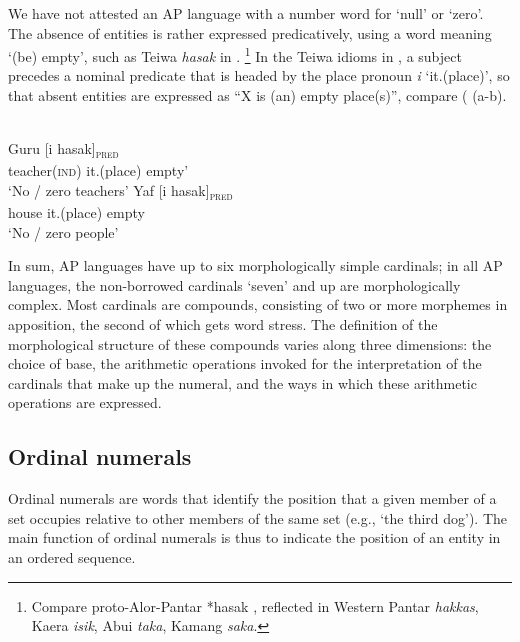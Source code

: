 We have not attested an AP language with a number word for `null' or `zero'. The absence of entities is rather expressed predicatively, using a word meaning `(be) empty', such as Teiwa \textit{hasak} in .
\footnote{{}  Compare proto-Alor-Pantar *hasak \citep{HoltonRobinsonTV}, reflected in Western Pantar \textit{hakkas}, Kaera \textit{isik}, Abui \textit{taka}, Kamang \textit{saka}.} In the Teiwa idioms in , a subject precedes a nominal predicate that is headed by the place pronoun \textit{i} `it.(place)', so that absent entities are expressed as ``X is (an) empty place(s)'', compare ( (a-b).


\ea%
\label{bkm:Ref355363568}
\\
\ea
\label{ex:8:1234}
\gll Guru       [i       hasak]\textsc{\textsubscript{pred}} \\  
     teacher\textsc{(ind)}   it.(place)    empty'  \\
\glt  `No / zero teachers' 
\ex
\gll Yaf [i     hasak]\textsc{\textsubscript{pred}} \\
    house      it.(place)   empty\\
\glt    `No / zero people' 
\z
\z

In sum, AP languages have up to six morphologically simple cardinals; in all AP languages, the non-borrowed cardinals `seven' and up are morphologically complex. Most cardinals are compounds, consisting of two or more morphemes in apposition, the second of which gets word stress. The definition of the morphological structure of these compounds varies along three dimensions: the choice of base, the arithmetic operations invoked for the interpretation of the cardinals that make up the numeral, and the ways in which these arithmetic operations are expressed. 

\subsection{Ordinal  numerals}
\label{sec:8:Ordinal}
Ordinal numerals are words that identify the position that a given member of a set occupies relative to other members of the same set (e.g., `the third dog'). The main function of ordinal numerals is thus to indicate the position of an entity in an ordered sequence. 

